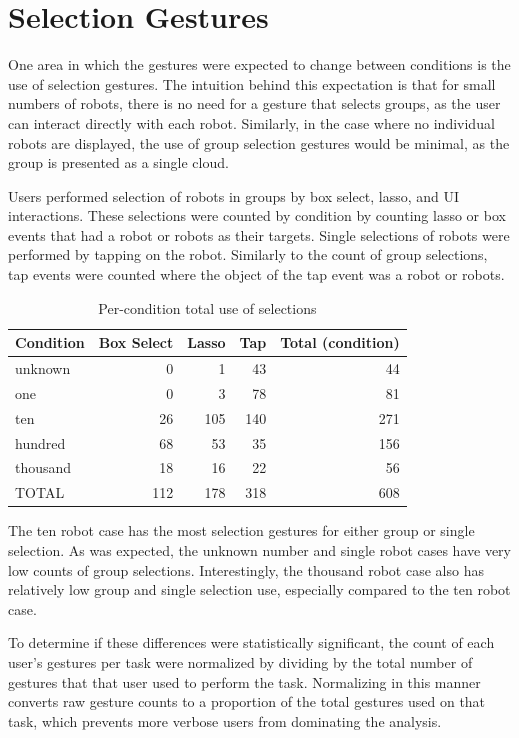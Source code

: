 \section{Selection Gestures} \label{section:Selection_Gestures}
One area in which the gestures were expected to change between conditions is the use of selection gestures. 
The intuition behind this expectation is that for small numbers of robots, there is no need for a gesture that selects groups, as the user can interact directly with each robot. 
Similarly, in the case where no individual robots are displayed, the use of group selection gestures would be minimal, as the group is presented as a single cloud. 

Users performed selection of robots in groups by box select, lasso, and UI interactions.
These selections were counted by condition by counting lasso or box events that had a robot or robots as their targets. 
Single selections of robots were performed by tapping on the robot. 
Similarly to the count of group selections, tap events were counted where the object of the tap event was a robot or robots. 


\begin{table}
	\centering
	\begin{tabular}{l r r r r}
		Condition & Box Select & Lasso & Tap & Total (condition)\\
		\hline
		unknown & 0 & 1 & 43 & 44 \\
		one & 0 & 3 & 78 & 81\\
		ten & 26 & 105 & 140 & 271\\
		hundred & 68 & 53 & 35 & 156\\
		thousand & 18 & 16 & 22 & 56\\
		\hline
		TOTAL & 112 & 178 & 318 & 608\\
	\end{tabular}
	\caption{Per-condition total use of selections}
\end{table}


The ten robot case has the most selection gestures for either group or single selection. 
As was expected, the unknown number and single robot cases have very low counts of group selections. 
Interestingly, the thousand robot case also has relatively low group and single 
selection use, especially compared to the ten robot case. 

To determine if these differences were statistically significant, the count of each user's gestures per task were normalized by dividing by the total number of gestures that that user used to perform the task. 
Normalizing in this manner converts raw gesture counts to a proportion of the total gestures used on that task, which prevents more verbose users from dominating the analysis.

